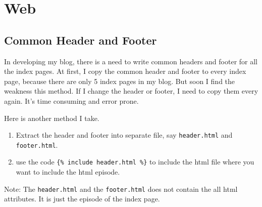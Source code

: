 
\chapter{Web}

\section{Common Header and Footer}

In developing my blog, there is a need to write common headers and footer for all the index pages.
At first, I copy the common header and footer to every index page, because there are only 5 index pages in my blog.
But soon I find the weakness this method.
If I change the header or footer, I need to copy them every again.
It's time consuming and error prone.

Here is another method I take.
\begin{enumerate}
\item Extract the header and footer into separate file, say \verb|header.html| and \verb|footer.html|.
\item use the code \verb|{% include header.html %}| to include the html file where you want to include the html episode.
\end{enumerate}


\begin{tcolorbox}
  Note:
  The \verb|header.html| and the \verb|footer.html| does not contain the all html attributes.
  It is just the episode of the index page.
\end{tcolorbox}
